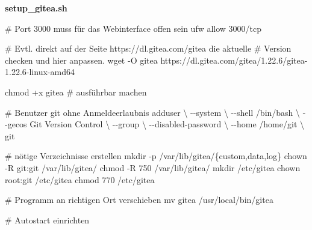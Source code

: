 \documentclass[
  letterpaper,
  DIV=11]{scrreprt}
\newenvironment{Shaded}{\begin{snugshade}}{\end{snugshade}}
\newcommand{\AttributeTok}[1]{\textcolor[rgb]{0.40,0.45,0.13}{#1}}
\newcommand{\CommentTok}[1]{\textcolor[rgb]{0.37,0.37,0.37}{#1}}
\newcommand{\DataTypeTok}[1]{\textcolor[rgb]{0.68,0.00,0.00}{#1}}
\newcommand{\ExtensionTok}[1]{\textcolor[rgb]{0.00,0.23,0.31}{#1}}
\newcommand{\FunctionTok}[1]{\textcolor[rgb]{0.28,0.35,0.67}{#1}}
\newcommand{\NormalTok}[1]{\textcolor[rgb]{0.00,0.23,0.31}{#1}}
\newcommand{\OperatorTok}[1]{\textcolor[rgb]{0.37,0.37,0.37}{#1}}
\newcommand{\StringTok}[1]{\textcolor[rgb]{0.13,0.47,0.30}{#1}}
\begin{document}
\textbf{setup\_gitea.sh}

\begin{Shaded}
\begin{Highlighting}[]

\CommentTok{\# Port 3000 muss für das Webinterface offen sein}
\ExtensionTok{ufw}\NormalTok{ allow 3000/tcp}

\CommentTok{\# Evtl. direkt auf der Seite https://dl.gitea.com/gitea die aktuelle}
\CommentTok{\# Version checken  und hier anpassen.}
\FunctionTok{wget} \AttributeTok{{-}O}\NormalTok{ gitea https://dl.gitea.com/gitea/1.22.6/gitea{-}1.22.6{-}linux{-}amd64}

\FunctionTok{chmod}\NormalTok{ +x gitea  }\CommentTok{\# ausführbar machen}

\CommentTok{\# Benutzer git ohne Anmeldeerlaubnis}
\ExtensionTok{adduser} \DataTypeTok{\textbackslash{}}
   \AttributeTok{{-}{-}system} \DataTypeTok{\textbackslash{}}
   \AttributeTok{{-}{-}shell}\NormalTok{ /bin/bash }\DataTypeTok{\textbackslash{}}
   \AttributeTok{{-}{-}gecos} \StringTok{\textquotesingle{}Git Version Control\textquotesingle{}} \DataTypeTok{\textbackslash{}}
   \AttributeTok{{-}{-}group} \DataTypeTok{\textbackslash{}}
   \AttributeTok{{-}{-}disabled{-}password} \DataTypeTok{\textbackslash{}}
   \AttributeTok{{-}{-}home}\NormalTok{ /home/git }\DataTypeTok{\textbackslash{}}
\NormalTok{   git}

\CommentTok{\# nötige Verzeichnisse erstellen}
\FunctionTok{mkdir} \AttributeTok{{-}p}\NormalTok{ /var/lib/gitea/}\DataTypeTok{\{custom}\OperatorTok{,}\DataTypeTok{data}\OperatorTok{,}\DataTypeTok{log\}}
\FunctionTok{chown} \AttributeTok{{-}R}\NormalTok{ git:git /var/lib/gitea/}
\FunctionTok{chmod} \AttributeTok{{-}R}\NormalTok{ 750 /var/lib/gitea/}
\FunctionTok{mkdir}\NormalTok{ /etc/gitea}
\FunctionTok{chown}\NormalTok{ root:git /etc/gitea}
\FunctionTok{chmod}\NormalTok{ 770 /etc/gitea}

\CommentTok{\# Programm an richtigen Ort verschieben}
\FunctionTok{mv}\NormalTok{ gitea /usr/local/bin/gitea}

\CommentTok{\# Autostart einrichten }


\end{Highlighting}
\end{Shaded}
\end{document}
